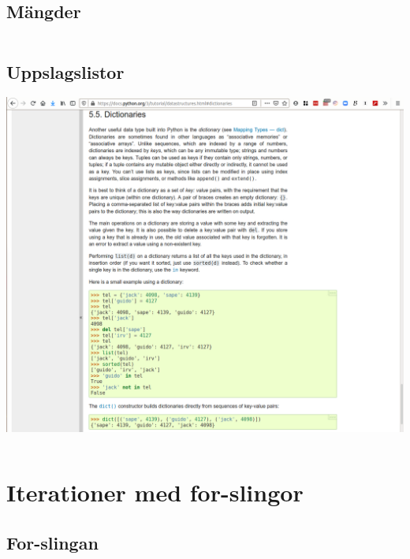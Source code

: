 \subsection{Mängder}

\begin{frame}[fragile]
  \begin{example}[sets.py]
    \inputminted{python}{examples/sets.py}
  \end{example}
\end{frame}


\subsection{Uppslagslistor}

\begin{frame}
  \includegraphics[width=\columnwidth]{figs/docs-dicts.png}
\end{frame}

\begin{frame}[fragile]
  \begin{example}[phone.py]
    \inputminted{python}{examples/phone.py}
  \end{example}
\end{frame}


\section{Iterationer med for-slingor}

\subsection{For-slingan}

